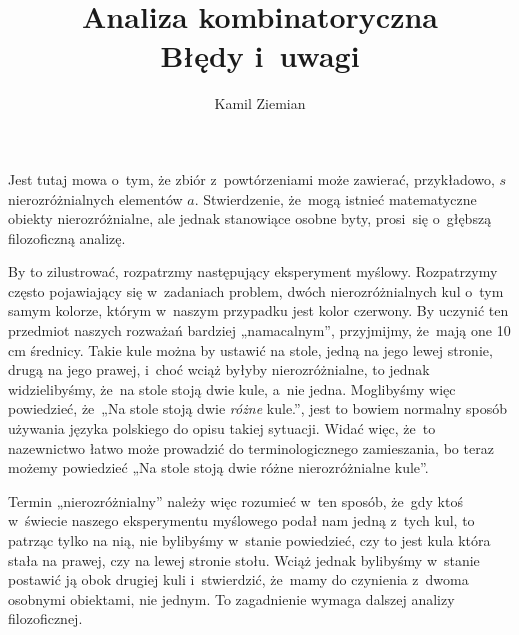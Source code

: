 \documentclass[a4paper,11pt]{article}
\title{Analiza kombinatoryczna \\
  Błędy i~uwagi}
\author{Kamil Ziemian}
\begin{document}





\maketitle %






\vspace{0em}



\vspace{0em}


\noindent
{} Jest tutaj mowa o~tym, że zbiór z~powtórzeniami może
zawierać, przykładowo, $s$ nierozróżnialnych elementów $a$. Stwierdzenie,
że~mogą istnieć matematyczne obiekty nierozróżnialne, ale jednak stanowiące
osobne byty, prosi~się o~głębszą filozoficzną analizę.

By to zilustrować, rozpatrzmy następujący eksperyment myślowy. Rozpatrzymy
często pojawiający się w~zadaniach problem, dwóch nierozróżnialnych kul
o~tym samym kolorze, którym w~naszym przypadku jest kolor czerwony. By
uczynić ten przedmiot naszych rozważań bardziej „namacalnym”, przyjmijmy,
że~mają one 10 cm średnicy. Takie kule można by ustawić na stole, jedną na
jego lewej stronie, drugą na jego prawej, i~choć wciąż byłyby
nierozróżnialne, to jednak widzielibyśmy, że~na stole stoją dwie kule,
a~nie jedna. Moglibyśmy więc powiedzieć, że~„Na stole stoją dwie
\textit{różne} kule.”, jest to bowiem normalny sposób używania języka
polskiego do opisu takiej sytuacji. Widać więc, że~to nazewnictwo łatwo
może prowadzić do terminologicznego zamieszania, bo teraz możemy powiedzieć
„Na stole stoją dwie różne nierozróżnialne kule”.

Termin „nierozróżnialny” należy więc rozumieć w~ten sposób, że~gdy ktoś
w~świecie naszego eksperymentu myślowego podał nam jedną z~tych kul, to
patrząc tylko na nią, nie bylibyśmy w~stanie powiedzieć, czy to jest kula
która stała na prawej, czy na lewej stronie stołu. Wciąż jednak bylibyśmy
w~stanie postawić ją obok drugiej kuli i~stwierdzić, że~mamy do czynienia
z~dwoma osobnymi obiektami, nie jednym. To zagadnienie wymaga dalszej analizy
filozoficznej.
\end{document}
